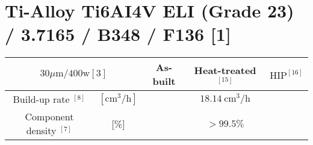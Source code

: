 \documentclass[10pt]{article}
\begin{document}
\section*{Ti-Alloy Ti6AI4V ELI (Grade 23) / 3.7165 / B348 / F136 [1]}
\begin{center}
\begin{tabular}{|c|c|c|c|c|}
\hline
\multicolumn{2}{|c|}{$30 \mu \mathrm{m} / 400 \mathrm{w}[3]$} & As-built & Heat-treated ${ }^{[15]}$ & $\mathrm{HIP}^{[16]}$ \\
\hline
Build-up rate ${ }^{[8]}$ & $\left[\mathrm{cm}^{3} / \mathrm{h}\right]$ &  & $18.14 \mathrm{~cm}^{3} / \mathrm{h}$ &  \\
\hline
Component density $^{[7]}$ & [\%] &  & $>99.5 \%$ &  \\
\hline
\end{tabular}
\end{center}
\end{document}
